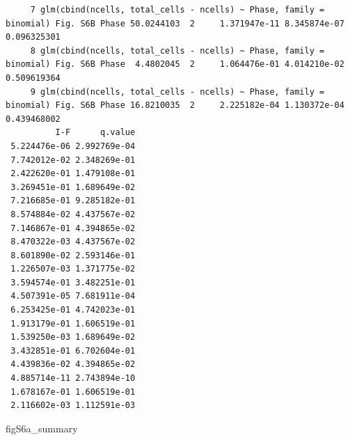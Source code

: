 \documentclass[
  landscape]{article}
\newenvironment{Shaded}{\begin{snugshade}}{\end{snugshade}}
\newcommand{\NormalTok}[1]{#1}
\begin{document}
\begin{verbatim}
     7 glm(cbind(ncells, total_cells - ncells) ~ Phase, family = binomial) Fig. S6B Phase 50.0244103  2     1.371947e-11 8.345874e-07 0.096325301
     8 glm(cbind(ncells, total_cells - ncells) ~ Phase, family = binomial) Fig. S6B Phase  4.4802045  2     1.064476e-01 4.014210e-02 0.509619364
     9 glm(cbind(ncells, total_cells - ncells) ~ Phase, family = binomial) Fig. S6B Phase 16.8210035  2     2.225182e-04 1.130372e-04 0.439468002
          I-F      q.value
 5.224476e-06 2.992769e-04
 7.742012e-02 2.348269e-01
 2.422620e-01 1.479108e-01
 3.269451e-01 1.689649e-02
 7.216685e-01 9.285182e-01
 8.574884e-02 4.437567e-02
 7.146867e-01 4.394865e-02
 8.470322e-03 4.437567e-02
 8.601890e-02 2.593146e-01
 1.226507e-03 1.371775e-02
 3.594574e-01 3.482251e-01
 4.507391e-05 7.681911e-04
 6.253425e-01 4.742023e-01
 1.913179e-01 1.606519e-01
 1.539250e-03 1.689649e-02
 3.432851e-01 6.702604e-01
 4.439836e-02 4.394865e-02
 4.885714e-11 2.743894e-10
 1.678167e-01 1.606519e-01
 2.116602e-03 1.112591e-03
\end{verbatim}

\begin{Shaded}
\begin{Highlighting}[]
\NormalTok{figS6a\_summary}
\end{Highlighting}
\end{Shaded}
\end{document}
